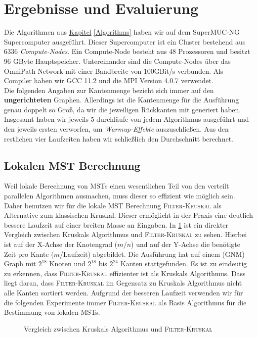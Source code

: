 \section{Ergebnisse und Evaluierung}\label{Evaluierung}
Die Algorithmen aus \hyperref[Algorithms]{Kapitel} \ref{Algorithms} haben wir auf dem SuperMUC-NG Supercomputer ausgeführt. Dieser Supercomputer ist ein Cluster bestehend aus 6336 \emph{Compute-Nodes}. Ein Compute-Node besteht aus 48 Prozessoren und besitzt 96 GByte Hauptspeicher. Untereinander sind die Compute-Nodes über das OmniPath-Network mit einer Bandbreite von 100GBit/s verbunden. Als Compiler haben wir GCC 11.2 und die MPI Version 4.0.7 verwendet.\\
 Die folgenden Angaben zur Kantenmenge bezieht sich immer auf den \textbf{ungerichteten} Graphen. Allerdings ist die Kantenmenge für die Ausführung genau doppelt so Groß, da wir die jeweiligen Rückkanten mit generiert haben. Insgesamt haben wir jeweils 5 durchläufe von jedem Algorithmus ausgeführt und den jeweils ersten verworfen, um \emph{Warmup-Effekte} auszuschließen. Aus den restlichen vier Laufzeiten haben wir schließlich den Durchschnitt berechnet.

\subsection{Lokalen MST Berechnung}
Weil lokale Berechnung von MSTs einen wesentlichen Teil von den verteilt parallelen Algorithmen ausmachen, muss dieser so effizient wie möglich sein. 
Daher benutzen wir für die lokale MST Berechnung 
\textsc{Filter-Kruskal} als Alternative zum klassischen Kruskal. Dieser ermöglicht in der Praxis eine deutlich bessere Laufzeit auf einer breiten Masse an Eingaben. 
In \cref{Filter-Kruskal-Img} ist ein direkter Vergleich zwischen Kruskals Algorithmus und \textsc{Filter-Kruskal} zu sehen. Hierbei ist auf der X-Achse der Knotengrad ($m/n$) und auf der Y-Achse die benötigte Zeit pro Kante ($m$/Laufzeit) abgebildet. Die Ausführung hat auf einem (GNM) Graph mit $2^{18}$ Knoten und $2^{18}$ bis $2^{24}$ Kanten stattgefunden.
Es ist zu eindeutig zu erkennen, dass \textsc{Filter-Kruskal} effizienter ist als Kruskals Algorithmus. Dass liegt daran, dass \textsc{Filter-Kruskal} im Gegensatz zu Kruskals Algorithmus nicht alle Kanten sortiert werden.
Aufgrund der besseren Laufzeit verwenden wir für die folgenden Experimente immer \textsc{Filter-Kruskal} als Basis Algorithmus für die Bestimmung von lokalen MSTs.

\begin{figure}[H]
    \centering
    
    \caption{Vergleich zwischen Kruskals Algorithmus und \textsc{Filter-Kruskal}}
    \label{Filter-Kruskal-Img}
\end{figure}



